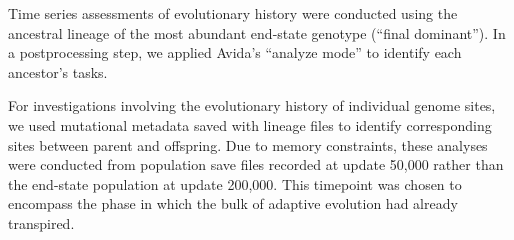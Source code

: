 Time series assessments of evolutionary history were conducted using the ancestral lineage of the most abundant end-state genotype (``final dominant'').
In a postprocessing step, we applied Avida's ``analyze mode'' to identify each ancestor's tasks.

For investigations involving the evolutionary history of individual genome sites, we used mutational metadata saved with lineage files to identify corresponding sites between parent and offspring.
Due to memory constraints, these analyses were conducted from population save files recorded at update 50,000 rather than the end-state population at update 200,000.
This timepoint was chosen to encompass the phase in which the bulk of adaptive evolution had already transpired.

